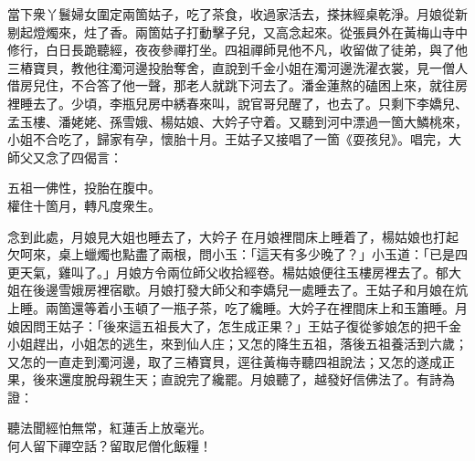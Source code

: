 當下衆丫鬟婦女圍定兩箇姑子，吃了茶食，收過家活去，搽抹經桌乾淨。月娘從新剔起燈燭來，炷了香。兩箇姑子打動擊子兒，又高念起來。從張員外在黃梅山寺中修行，白日長跪聽經，夜夜參禪打坐。四祖禪師見他不凡，收留做了徒弟，與了他三樁寶貝，教他往濁河邊投胎奪舍，直說到千金小姐在濁河邊洗濯衣裳，見一僧人借房兒住，不合答了他一聲，那老人就跳下河去了。潘金蓮熬的磕困上來，就往房裡睡去了。{}少頃，李瓶兒房中綉春來叫，說官哥兒醒了，也去了。只剩下李嬌兒、孟玉樓、潘姥姥、孫雪娥、楊姑娘、大妗子守着。又聽到河中漂過一箇大鱗桃來，小姐不合吃了，歸家有孕，懷胎十月。王姑子又接唱了一箇《耍孩兒》。唱完，大師父又念了四偈言：

\begin{myquote}
五祖一佛性，投胎在腹中。\\權住十箇月，轉凡度衆生。
\end{myquote}

念到此處，月娘見大姐也睡去了，大妗子𢱉在月娘裡間床上睡着了，楊姑娘也打起欠呵來，{}桌上蠟燭也點盡了兩根，問小玉：「這天有多少晚了？」小玉道：「已是四更天氣，雞叫了。」月娘方令兩位師父收拾經卷。楊姑娘便往玉樓房裡去了。郁大姐在後邊雪娥房裡宿歇。月娘打發大師父和李嬌兒一處睡去了。王姑子和月娘在炕上睡。兩箇還等着小玉頓了一瓶子茶，吃了纔睡。大妗子在裡間床上和玉簫睡。月娘因問王姑子：「後來這五祖長大了，怎生成正果？」{}王姑子復從爹娘怎的把千金小姐趕出，小姐怎的逃生，來到仙人庄；又怎的降生五祖，落後五祖養活到六歲；又怎的一直走到濁河邊，取了三樁寶貝，逕往黃梅寺聽四祖說法；又怎的遂成正果，後來還度脫母親生天；直說完了纔罷。月娘聽了，越發好信佛法了。有詩為證：

\begin{myquote}
聽法聞經怕無常，紅蓮舌上放毫光。\\何人留下禪空話？留取尼僧化飯糧！
\end{myquote}

 

